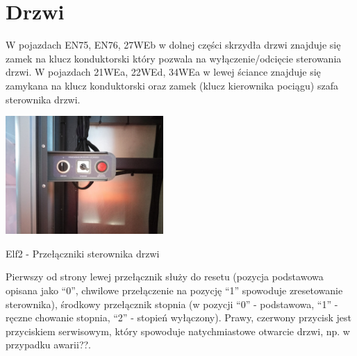 \section{Drzwi}
W pojazdach EN75, EN76, 27WEb w dolnej części skrzydła drzwi znajduje się zamek na klucz konduktorski który pozwala na wyłączenie/odcięcie sterowania drzwi. W pojazdach 21WEa, 22WEd, 34WEa w lewej ściance znajduje się zamykana na klucz konduktorski oraz zamek (klucz kierownika pociągu) szafa sterownika drzwi.
	\begin{marginfigure}
		\includegraphics[width=6cm]{skryptkierownik-img/skryptkierownik-img048.jpg}
		\caption{Elf2 - Przełączniki sterownika drzwi}
	\end{marginfigure}

Pierwszy od strony lewej przełącznik służy do resetu (pozycja podstawowa opisana jako “0”, chwilowe przełączenie na pozycję “1” spowoduje zresetowanie sterownika), środkowy przełącznik stopnia (w pozycji “0” - podstawowa, “1” - ręczne chowanie stopnia, “2” - stopień wyłączony). Prawy, czerwony przycisk jest przyciskiem serwisowym, który spowoduje natychmiastowe otwarcie drzwi, np. w przypadku awarii??.


